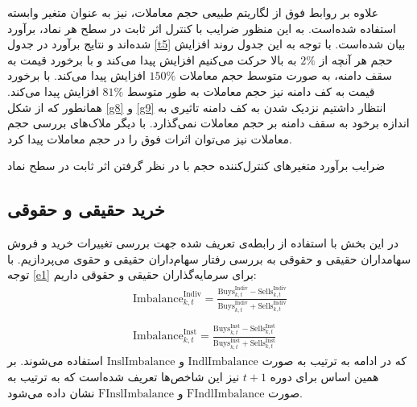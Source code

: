 \documentclass[12pt]{article}
\begin{document}
 علاوه بر روابط فوق از لگاریتم طبیعی حجم معاملات، نیز به عنوان متغیر وابسته استفاده شده‌است. به این منظور ضرایب با کنترل اثر ثابت در سطح هر نماد، برآورد شده‌اند و نتایج برآورد در جدول 
 \ref{t5}
 بیان شده‌است. با توجه به این جدول  روند افزایش حجم هر آنچه از 
$  2 \% $
 به بالا حرکت می‌کنیم افزایش پیدا می‌کند و با 
 برخورد قیمت به سقف دامنه، به صورت متوسط حجم معاملات
  $ 150\% $
  افزایش پیدا می‌کند. 
 با برخورد قیمت به کف دامنه نیز حجم معاملات به طور متوسط 
  $ 81\% $
  افزایش پیدا می‌کند. همانطور که از شکل 
  \ref{g8}
  و
  \ref{g9}
  انتظار داشتیم نزدیک شدن به کف دامنه تاثیری به اندازه برخود به سقف دامنه بر حجم معاملات نمی‌گذارد.
  با دیگر ملاک‌های بررسی حجم معاملات نیز می‌توان اثرات فوق را در حجم معاملات پیدا کرد.
 



\begin{table}[htbp]
\centering
\begin{LTR}
\lr{}
\end{LTR}
\caption{ضرایب برآورد متغیر‌های کنترل‌کننده حجم با در نظر گرفتن اثر ثابت در سطح نماد}
\label{t5}
\end{table}


\restoregeometry
\FloatBarrier

\subsection{خرید حقیقی و حقوقی}
در این بخش با استفاده از رابطه‌ی تعریف شده جهت بررسی تغییرات خرید و فروش سهامداران حقیقی و حقوقی به بررسی رفتار سهام‌داران حقیقی و حقوی می‌پردازیم.
با توجه  
\ref{e1} 
برای سرمایه‌گذاران حقیقی و حقوقی داریم:
\begin{align*}
\text{Imbalance}_{k,t}^{\text{Indiv}} = \frac{\text{Buys}_{k,t}^{\text{Indiv}} - \text{Sells}_{k,t}^{\text{Indiv}}}{\text{Buys}_{k,t}^{\text{Indiv}} + \text{Sells}_{k,t}^{\text{Indiv}}}\\\\
\text{Imbalance}_{k,t}^{\text{Inst}} = \frac{\text{Buys}_{k,t}^{\text{Inst}} - \text{Sells}_{k,t}^{\text{Inst}}}{\text{Buys}_{k,t}^{\text{Inst}} + \text{Sells}_{k,t}^{\text{Inst}}}
\end{align*}
که در ادامه به ترتیب به صورت 
$ \text{IndlImbalance}  $
و
$ \text{InslImbalance} $
استفاده می‌شوند.
بر همین اساس برای دوره $ t+1 $ نیز این شاخص‌ها تعریف شده‌است که به ترتیب به صورت 
$ \text{FIndlImbalance}  $
و
$ \text{FInslImbalance} $
نشان داده می‌شود.
\end{document}
